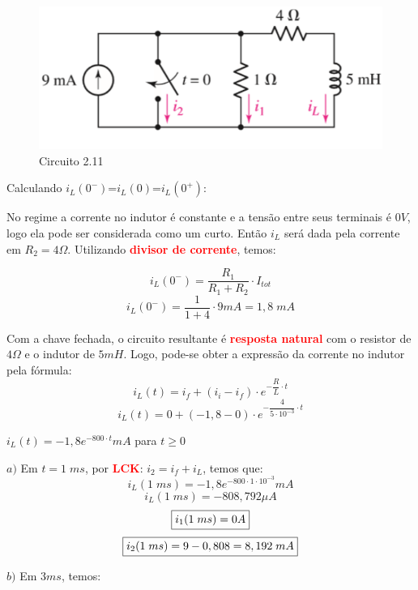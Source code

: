 \documentclass[
	12pt,				%
	oneside,			%
	a4paper,			%
	english,			%
	french,				%
	spanish,			%
	brazil				%
	]{abntex2}
\begin{document}
\begin{figure}[htb]
	\centering
	\includegraphics[scale=0.6]{2-11.PNG}
	\caption{Circuito 2.11}
\end{figure}

Calculando $i_L(0^-)$=$i_L(0)$=$i_L(0^+)$:

No regime a corrente no indutor é constante e a tensão entre seus terminais é $0V$, logo ela pode ser considerada como um curto. Então $i_L$ será dada pela corrente em $R_2 = 4 \Omega $. Utilizando \textbf{\textcolor{red}{divisor de corrente}}, temos:

$$i_L(0^-) = \dfrac{R_1}{R_1 + R_2} \cdot I_{tot} $$
$$i_L(0^-) = \dfrac{1}{1 + 4} \cdot 9 mA = 1,8\;mA$$

Com a chave fechada, o circuito resultante é \textbf{\textcolor{red}{resposta natural}} com o resistor de $4 \Omega$ e o indutor de $5 mH$. Logo, pode-se obter a expressão da corrente no indutor pela fórmula:
$$ i_L(t) = i_{f} + (i_{i} - i_{f})\cdot e^{{-\dfrac{R}{L}}\cdot t} $$
$$ i_L(t) = 0 + (-1,8 - 0)\cdot e^{-\dfrac{4}{5\cdot10^{-3}}\cdot t} $$
\begin{center}
    $i_L(t) = -1,8e^{-800\cdot t} mA$     para    $t \ge 0$
\end{center}

$a)$ Em $t = 1\;ms$, por \textbf{\textcolor{red}{LCK}}: $i_2 = i_f + i_L$, temos que:
$$ i_L(1\;ms) = -1,8e^{-800\cdot 1 \cdot 10^{-3}} mA$$
$$i_L(1\;ms) = -808,792 \mu A$$
\begin{equation}
    \fbox{$i_1(1\;ms) = 0 A$}
\end{equation}
\begin{equation}
\fbox{$i_2(1\;ms) = 9 - 0,808 = 8,192\;mA$}
\end{equation}

\newpage %

$b)$ Em $3 ms$, temos:
\end{document}
